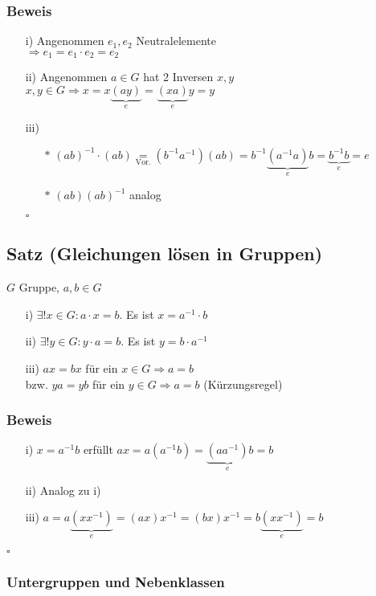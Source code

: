\documentclass[12pt,titlepage, pdf]{article}
\renewcommand{\>}{\rightarrow}
\renewcommand{\*}{\cdot}
\begin{document}
\subsubsection*{Beweis}
\begin{itemize}
	\item[i)] Angenommen $e_1,e_2$ Neutralelemente \\
	$\Rightarrow e_1 = e_1 \cdot e_2 = e_2$
	\item[ii)] Angenommen $a \in G$ hat 2 Inversen $x,y$\\
	 $x,y \in G \Rightarrow x = x\underbrace{(ay)}_{e} = \underbrace{(xa)}_e y = y$
	\item[iii)] 
	\begin{itemize}
		\item[$\ast$] $(ab)^{-1} \cdot (ab) \underset{\textrm{Vor.}}{=} (b^{-1}a^{-1})(ab) = b^{-1}\underbrace{(a^{-1}a)}_e b = \underbrace{b^{-1}b}_e = e$
		\item[$\ast$] $(ab)(ab)^{-1}$ analog
	\end{itemize}
\hfill$\square$
\end{itemize}
\subsection{Satz (Gleichungen lösen in Gruppen)}
$G$ Gruppe, $a,b \in G$
\begin{itemize}
	\item[i)] $\exists! x \in G: a \cdot x = b$. \quad Es ist $x = a^{-1} \cdot b$
	\item[ii)] $\exists! y \in G: y \cdot a = b$. \quad Es ist $y = b \cdot a^{-1}$
	\item[iii)] $ax = bx$ für ein $x \in G \Rightarrow a = b$\\
	bzw. $ya = yb$ für ein $y \in G \Rightarrow a = b$ (Kürzungsregel)
\end{itemize}
\subsubsection*{Beweis}
\begin{itemize}
	\item[i)] $x = a^{-1}b$ erfüllt $ax = a(a^{-1}b) = \underbrace{(aa^{-1})}_e b = b$
	\item[ii)] Analog zu i)
	\item[iii)] $a = a\underbrace{(xx^{-1})}_{e} = (ax)x^{-1} = (bx)x^{-1} = b\underbrace{(xx^{-1})}_{e} = b$ 
\end{itemize}
\hfill$\square$
\subsubsection*{Untergruppen und Nebenklassen}
\end{document}
